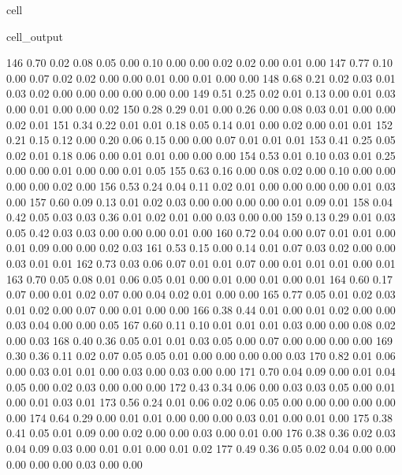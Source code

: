 \documentclass[letterpaper,10pt,french]{sphinxmanual}
\begin{document}
\begin{sphinxuseclass}{cell}
\begin{sphinxuseclass}{cell_output}
\begin{sphinxVerbatim}[commandchars=\\\{\}]
       146	0.70 	0.02 	0.08 	0.05 	0.00 	0.10 	0.00 	0.00 	0.02 	0.02 	0.00 	0.01 	0.00
       147	0.77 	0.10 	0.00 	0.07 	0.02 	0.02 	0.00 	0.00 	0.01 	0.00 	0.01 	0.00 	0.00
       148	0.68 	0.21 	0.02 	0.03 	0.01 	0.03 	0.02 	0.00 	0.00 	0.00 	0.00 	0.00 	0.00
       149	0.51 	0.25 	0.02 	0.01 	0.13 	0.00 	0.01 	0.03 	0.00 	0.01 	0.00 	0.00 	0.02
       150	0.28 	0.29 	0.01 	0.00 	0.26 	0.00 	0.08 	0.03 	0.01 	0.00 	0.00 	0.02 	0.01
       151	0.34 	0.22 	0.01 	0.01 	0.18 	0.05 	0.14 	0.01 	0.00 	0.02 	0.00 	0.01 	0.01
       152	0.21 	0.15 	0.12 	0.00 	0.20 	0.06 	0.15 	0.00 	0.00 	0.07 	0.01 	0.01 	0.01
       153	0.41 	0.25 	0.05 	0.02 	0.01 	0.18 	0.06 	0.00 	0.01 	0.01 	0.00 	0.00 	0.00
       154	0.53 	0.01 	0.10 	0.03 	0.01 	0.25 	0.00 	0.00 	0.01 	0.00 	0.00 	0.01 	0.05
       155	0.63 	0.16 	0.00 	0.08 	0.02 	0.00 	0.10 	0.00 	0.00 	0.00 	0.00 	0.02 	0.00
       156	0.53 	0.24 	0.04 	0.11 	0.02 	0.01 	0.00 	0.00 	0.00 	0.00 	0.01 	0.03 	0.00
       157	0.60 	0.09 	0.13 	0.01 	0.02 	0.03 	0.00 	0.00 	0.00 	0.00 	0.01 	0.09 	0.01
       158	0.04 	0.42 	0.05 	0.03 	0.03 	0.36 	0.01 	0.02 	0.01 	0.00 	0.03 	0.00 	0.00
       159	0.13 	0.29 	0.01 	0.03 	0.05 	0.42 	0.03 	0.03 	0.00 	0.00 	0.00 	0.01 	0.00
       160	0.72 	0.04 	0.00 	0.07 	0.01 	0.01 	0.00 	0.01 	0.09 	0.00 	0.00 	0.02 	0.03
       161	0.53 	0.15 	0.00 	0.14 	0.01 	0.07 	0.03 	0.02 	0.00 	0.00 	0.03 	0.01 	0.01
       162	0.73 	0.03 	0.06 	0.07 	0.01 	0.01 	0.07 	0.00 	0.01 	0.01 	0.01 	0.00 	0.01
       163	0.70 	0.05 	0.08 	0.01 	0.06 	0.05 	0.01 	0.00 	0.01 	0.00 	0.01 	0.00 	0.01
       164	0.60 	0.17 	0.07 	0.00 	0.01 	0.02 	0.07 	0.00 	0.04 	0.02 	0.01 	0.00 	0.00
       165	0.77 	0.05 	0.01 	0.02 	0.03 	0.01 	0.02 	0.00 	0.07 	0.00 	0.01 	0.00 	0.00
       166	0.38 	0.44 	0.01 	0.00 	0.01 	0.02 	0.00 	0.00 	0.03 	0.04 	0.00 	0.00 	0.05
       167	0.60 	0.11 	0.10 	0.01 	0.01 	0.01 	0.03 	0.00 	0.00 	0.08 	0.02 	0.00 	0.03
       168	0.40 	0.36 	0.05 	0.01 	0.01 	0.03 	0.05 	0.00 	0.07 	0.00 	0.00 	0.00 	0.00
       169	0.30 	0.36 	0.11 	0.02 	0.07 	0.05 	0.05 	0.01 	0.00 	0.00 	0.00 	0.00 	0.03
       170	0.82 	0.01 	0.06 	0.00 	0.03 	0.01 	0.01 	0.00 	0.03 	0.00 	0.03 	0.00 	0.00
       171	0.70 	0.04 	0.09 	0.00 	0.01 	0.04 	0.05 	0.00 	0.02 	0.03 	0.00 	0.00 	0.00
       172	0.43 	0.34 	0.06 	0.00 	0.03 	0.03 	0.05 	0.00 	0.01 	0.00 	0.01 	0.03 	0.01
       173	0.56 	0.24 	0.01 	0.06 	0.02 	0.06 	0.05 	0.00 	0.00 	0.00 	0.00 	0.00 	0.00
       174	0.64 	0.29 	0.00 	0.01 	0.01 	0.00 	0.00 	0.00 	0.03 	0.01 	0.00 	0.01 	0.00
       175	0.38 	0.41 	0.05 	0.01 	0.09 	0.00 	0.02 	0.00 	0.00 	0.03 	0.00 	0.01 	0.00
       176	0.38 	0.36 	0.02 	0.03 	0.04 	0.09 	0.03 	0.00 	0.01 	0.01 	0.00 	0.01 	0.02
       177	0.49 	0.36 	0.05 	0.02 	0.04 	0.00 	0.00 	0.00 	0.00 	0.00 	0.03 	0.00 	0.00
\end{sphinxVerbatim}

\end{sphinxuseclass}
\end{sphinxuseclass}
\sphinxstepscope
\end{document}

